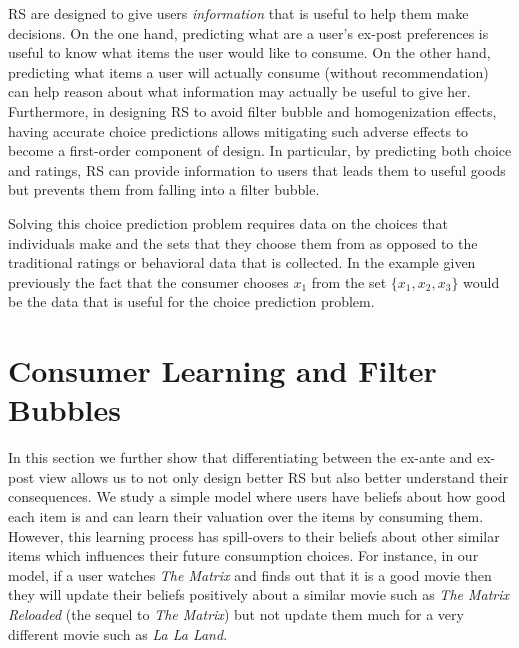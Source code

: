 \documentclass[sigconf]{acmart}
\begin{document}
\par
RS are designed to give users \textit{information} that is useful to help them make decisions. On the one hand, predicting what are a user's ex-post preferences is useful to know what items the user would like to consume. On the other hand, predicting what items a user will actually consume (without recommendation) can help reason about what information may actually be useful to give her. Furthermore, in designing RS to avoid filter bubble and homogenization effects, having accurate choice predictions allows mitigating such adverse effects to become a first-order component of design. In particular, by predicting both choice and ratings, RS can provide information to users that leads them to useful goods but prevents them from falling into a filter bubble. 
\par
Solving this choice prediction problem requires data on the choices that individuals make and the sets that they choose them from as opposed to the traditional ratings or behavioral data that is collected. In the example given previously the fact that the consumer chooses $x_1$ from the set $\{x_1, x_2, x_3 \}$ would be the data that is useful for the choice prediction problem.

\section{Consumer Learning and Filter Bubbles}\label{sec:consumer_learning}
In this section we further show that differentiating between the ex-ante and ex-post view allows us to not only design better RS but also better understand their consequences. We study a simple model where users have beliefs about how good each item is and can learn their valuation over the items by consuming them. However, this learning process has spill-overs to their beliefs about other similar items which influences their future consumption choices. For instance, in our model, if a user watches \textit{The Matrix} and finds out that it is a good movie then they will update their beliefs positively about a similar movie such as \textit{The Matrix Reloaded} (the sequel to \textit{The Matrix}) but not update them much for a very different movie such as \textit{La La Land}.
\end{document}
